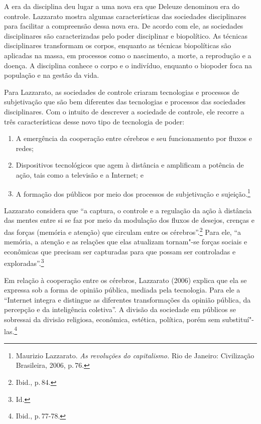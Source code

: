 A era da disciplina deu lugar a uma nova era que Deleuze denominou era
do controle. Lazzarato mostra algumas características das
sociedades disciplinares para facilitar a compreensão dessa nova era. De
acordo com ele, as sociedades disciplinares são caracterizadas pelo
poder disciplinar e biopolítico. As técnicas disciplinares transformam
os corpos, enquanto as técnicas biopolíticas são aplicadas na massa, em
processos como o nascimento, a morte, a reprodução e a doença. A
disciplina conhece o corpo e o indivíduo, enquanto o biopoder foca na
população e na gestão da vida.

Para Lazzarato, as sociedades de controle criaram tecnologias e
processos de subjetivação que são bem diferentes das tecnologias e
processos das sociedades disciplinares. Com o intuito de descrever a
sociedade de controle, ele recorre a três características desse novo
tipo de tecnologia de poder: 

\begin{enumerate}
\item A emergência da cooperação entre
cérebros e seu funcionamento por fluxos e redes;

\item Dispositivos
tecnológicos que agem à distância e amplificam a potência de ação, tais
como a televisão e a Internet; e 

\item A formação dos públicos por meio dos
processos de subjetivação e sujeição.\footnote{Maurizio Lazzarato. \emph{As revoluções do capitalismo.} Rio de Janeiro: Civilização Brasileira, 2006, p.\,76.}
\end{enumerate}

Lazzarato considera que ``a captura, o controle e a regulação da
ação à distância das mentes entre si se faz por meio da modulação dos
fluxos de desejos, crenças e das forças (memória e atenção) que circulam
entre os cérebros''.\footnote{Ibid., p.\,84.} Para ele, ``a memória, a atenção e as
relações que elas atualizam tornam"-se forças sociais e econômicas que
precisam ser capturadas para que possam ser controladas e exploradas''.\footnote{Id.}

Em relação à cooperação entre os cérebros, Lazzarato (2006) explica que
ela se expressa sob a forma de opinião pública, mediada pela tecnologia.
Para ele a ``Internet integra e distingue as diferentes transformações
da opinião pública, da percepção e da inteligência coletiva''. A divisão
da sociedade em públicos se sobressai da divisão religiosa, econômica,
estética, política, porém sem substituí"-las.\footnote{Ibid., p.\,77-78.}


